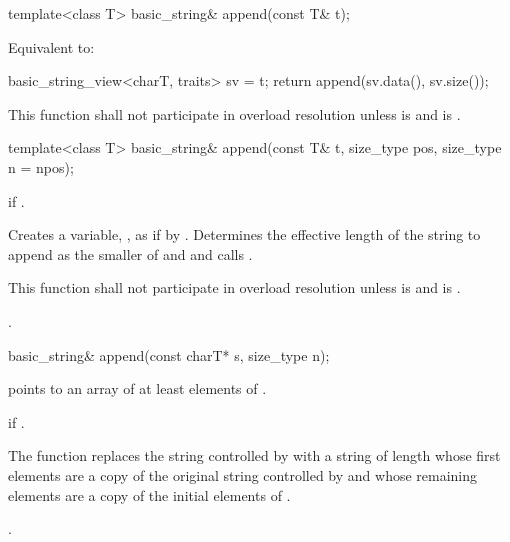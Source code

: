 %
\begin{itemdecl}
template<class T>
  basic_string& append(const T& t);
\end{itemdecl}

\begin{itemdescr}
\pnum
\effects
Equivalent to:
\begin{codeblock}
{
  basic_string_view<charT, traits> sv = t;
  return append(sv.data(), sv.size());
}
\end{codeblock}

\pnum
\remarks
This function shall not participate in overload resolution unless
 is  and
 is .
\end{itemdescr}

%
\begin{itemdecl}
template<class T>
  basic_string& append(const T& t, size_type pos, size_type n = npos);
\end{itemdecl}

\begin{itemdescr}
\pnum
\throws
{}
if
.

\pnum
\effects
Creates a variable, , as if by .
Determines the effective length  of the string to append
as the smaller of  and 
and calls .

\pnum
\remarks
This function shall not participate in overload resolution
unless 
is  and  is .

\pnum
\returns
{}.
\end{itemdescr}

%
\begin{itemdecl}
basic_string& append(const charT* s, size_type n);
\end{itemdecl}

\begin{itemdescr}
\pnum
\requires {} points to an array of at least  elements
of .

\pnum
\throws {} if .

\pnum
\effects The function replaces the string controlled by 
with a string of length  whose first 
elements are a copy of the original string controlled by 
and whose remaining elements are a copy of the initial  elements
of .

\pnum
\returns
{}.
\end{itemdescr}


